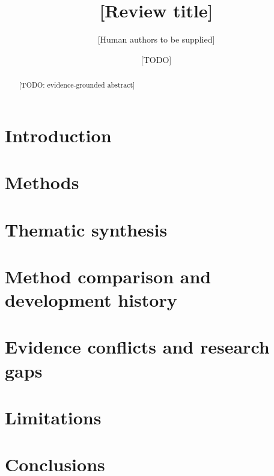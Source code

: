 \documentclass[11pt]{article}
\title{[Review title]}
\author{[Human authors to be supplied]}
\date{[TODO]}
\begin{document}
\maketitle
\begin{abstract}
[TODO: evidence-grounded abstract]
\end{abstract}
\section{Introduction}
\section{Methods}
\section{Thematic synthesis}
\section{Method comparison and development history}
\section{Evidence conflicts and research gaps}
\section{Limitations}
\section{Conclusions}


\end{document}
